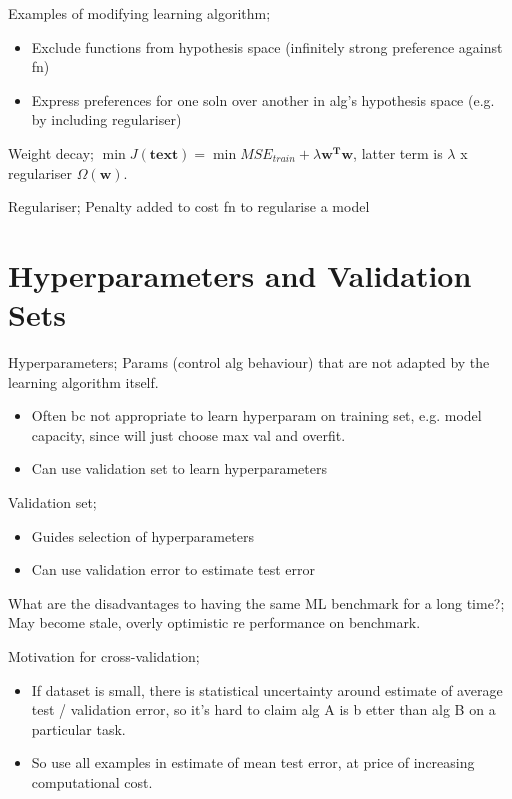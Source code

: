 \documentclass{article}
\begin{document}
Examples of modifying learning algorithm; \begin{itemize} \item Exclude functions from hypothesis space (infinitely strong preference against fn) \item Express preferences for one soln over another in alg's hypothesis space (e.g. by including regulariser) \end{itemize}

Weight decay; $\min J(\mathbf{text}) = \min MSE_{train} + \lambda\mathbf{w^Tw}$, latter term is $\lambda$ x regulariser $\Omega(\mathbf{w})$.

Regulariser; Penalty added to cost fn to regularise a model

\section{Hyperparameters and Validation Sets}

Hyperparameters; Params (control alg behaviour) that are not adapted by the learning algorithm itself. \begin{itemize} \item Often bc not appropriate to learn hyperparam on training set, e.g. model capacity, since will just choose max val and overfit.  \item Can use validation set to learn hyperparameters \end{itemize}

Validation set; \begin{itemize} \item Guides selection of hyperparameters \item Can use validation error to estimate test error \end{itemize}

What are the disadvantages to having the same ML benchmark for a long time?; May become stale, overly optimistic re performance on benchmark.

Motivation for cross-validation; \begin{itemize} \item If dataset is small, there is statistical uncertainty around estimate of average test / validation error, so it's hard to claim alg A is b etter than alg B on a particular task.  \item So use all examples in estimate of mean test error, at price of increasing computational cost.  \end{itemize}
\end{document}
